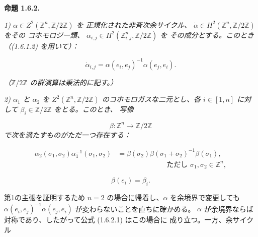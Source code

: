 \clearpage
{}%
\noindent\textbf{命題 1.6.2.}\quad

\noindent\emph{1) $\alpha\in Z^2(\mathbb Z^n,\mathbb Z/2\mathbb Z)$ を
正規化された非斉次余サイクル、
$\dot\alpha\in H^2(\mathbb Z^n,\mathbb Z/2\mathbb Z)$ をその
コホモロジー類、
$\dot\alpha_{i,j}\in H^2(\mathbb Z^n_{i,j},\mathbb Z/2\mathbb Z)$ を
その成分とする。このとき（(1.6.1.2) を用いて）：}

\begin{equation}
  \dot\alpha_{i,j}
  =\alpha(e_i,e_j)^{-1}\alpha(e_j,e_i).
  \tag{1.6.2.1}
\end{equation}

\noindent\emph{（$\mathbb Z/2\mathbb Z$ の群演算は乗法的に記す。）}

\noindent\emph{2) $\alpha_1$ と $\alpha_2$ を
$Z^2(\mathbb Z^n,\mathbb Z/2\mathbb Z)$ のコホモロガスな二元とし、各
$i\in[1,n]$ に対して $\beta_i\in\mathbb Z/2\mathbb Z$ をとる。このとき、
写像}

\begin{equation*}
  \beta\colon\mathbb Z^n\longrightarrow\mathbb Z/2\mathbb Z
\end{equation*}
\noindent\emph{で次を満たすものがただ一つ存在する：}

\begin{equation}
  \begin{aligned}
    \alpha_2(\sigma_1,\sigma_2)\alpha_1^{-1}(\sigma_1,\sigma_2)
      &=\beta(\sigma_2)\beta(\sigma_1+\sigma_2)^{-1}\beta(\sigma_1),\\[-1mm]
    &\hspace{7em}\text{ただし }\sigma_1,\sigma_2\in\mathbb Z^n,
  \end{aligned}
  \tag{1.6.2.2}
\end{equation}

\begin{equation}
  \beta(e_i)=\beta_i.
  \tag{1.6.2.3}
\end{equation}

第1の主張を証明するため $n=2$ の場合に帰着し、$\alpha$ を余境界で変更しても
$\alpha(e_i,e_j)^{-1}\alpha(e_j,e_i)$ が変わらないことを直ちに確かめる。
$\alpha$ が余境界ならば対称であり、したがって公式 (1.6.2.1) はこの場合に
成り立つ。一方、余サイクル


